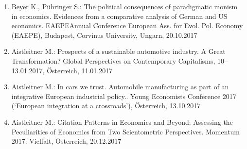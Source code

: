 \begin{enumerate}
	\item Beyer K., Pühringer S.: The political consequences of paradigmatic monism in economics. Evidences from a comparative analysis of German and US economics. EAEPEAnnual Conference European Ass. for Evol. Pol. Economy (EAEPE), Budapest, Corvinus University, Ungarn, 20.10.2017
	\item Aistleitner M.: Prospects of a sustainable automotive industry. A Great Transformation? Global Perspectives on Contemporary Capitalisms, 10--13.01.2017, Österreich, 11.01.2017
	\item Aistleitner M.: In cars we trust. Automobile manufacturing as part of an integrative European industrial policy.. Young Economists Conference 2017 (‘European integration at a crossroads’), Österreich, 13.10.2017
	\item Aistleitner M.: Citation Patterns in Economics and Beyond: Assessing the Peculiarities of Economics from Two Scientometric Perspectives. Momentum 2017: Vielfalt, Österreich, 20.12.2017
\end{enumerate}
